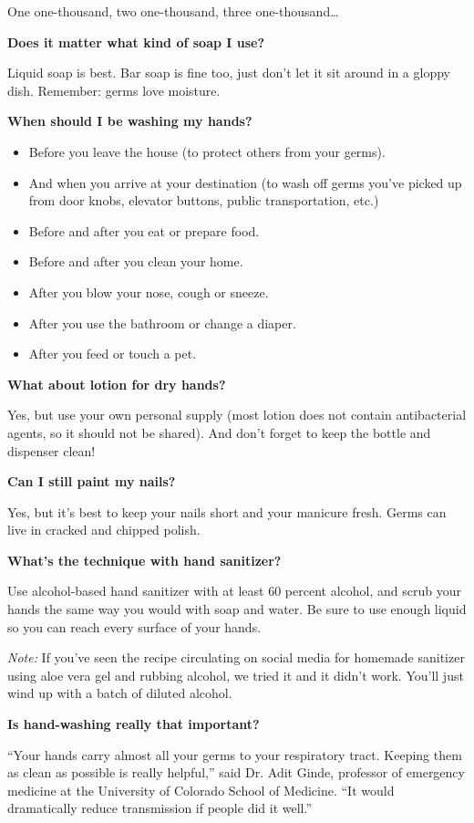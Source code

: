 One one-thousand, two one-thousand, three one-thousand\ldots{}

\textbf{Does it matter what kind of soap I use?}

Liquid soap is best. Bar soap is fine too, just don't let it sit around
in a gloppy dish. Remember: germs love moisture.

\textbf{When should I be washing my hands?}

\begin{itemize}
\item
  Before you leave the house (to protect others from your germs).
\item
  And when you arrive at your destination (to wash off germs you've
  picked up from door knobs, elevator buttons, public transportation,
  etc.)
\item
  Before and after you eat or prepare food.
\item
  Before and after you clean your home.
\item
  After you blow your nose, cough or sneeze.
\item
  After you use the bathroom or change a diaper.
\item
  After you feed or touch a pet.
\end{itemize}

\textbf{What about lotion for dry hands?}

Yes, but use your own personal supply (most lotion does not contain
antibacterial agents, so it should not be shared). And don't forget to
keep the bottle and dispenser clean!

\textbf{Can I still paint my nails?}

Yes, but it's best to keep your nails short and your manicure fresh.
Germs can live in cracked and chipped polish.

\textbf{What's the technique with hand sanitizer?}

Use alcohol-based hand sanitizer with at least 60 percent alcohol, and
scrub your hands the same way you would with soap and water. Be sure to
use enough liquid so you can reach every surface of your hands.

\emph{Note:} If you've seen the recipe circulating on social media for
homemade sanitizer using aloe vera gel and rubbing alcohol, we tried it
and it didn't work. You'll just wind up with a batch of diluted alcohol.

\textbf{Is hand-washing really that important?}

``Your hands carry almost all your germs to your respiratory tract.
Keeping them as clean as possible is really helpful,'' said Dr. Adit
Ginde, professor of emergency medicine at the University of Colorado
School of Medicine. ``It would dramatically reduce transmission if
people did it well.''

